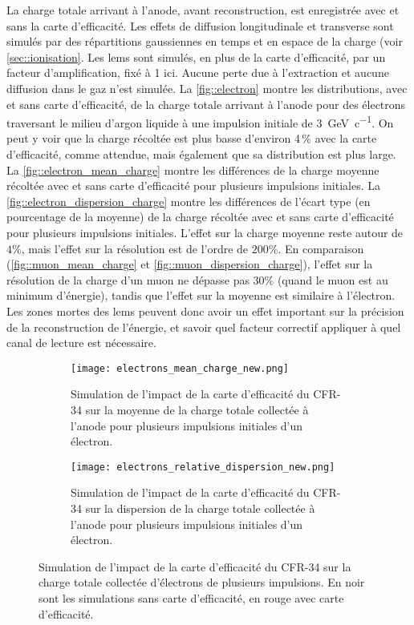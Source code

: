       La charge totale arrivant à l'anode, avant reconstruction, est enregistrée avec et sans la carte d'efficacité. Les effets de diffusion longitudinale et transverse sont simulés par des répartitions gaussiennes en temps et en espace de la charge (voir \autoref{sec::ionisation}. Les \glspl{lem} sont simulés, en plus de la carte d'efficacité, par un facteur d'amplification, fixé à 1 ici. Aucune perte due à l'extraction et aucune diffusion dans le gaz n'est simulée. La \autoref{fig::electron} montre les distributions, avec et sans carte d'efficacité, de la charge totale arrivant à l'anode pour des électrons traversant le milieu d'argon liquide à une impulsion initiale de \SI{3}{\giga\eV\per c}. On peut y voir que la charge récoltée est plus basse d'environ 4\,\% avec la carte d'efficacité, comme attendue, mais également que sa distribution est plus large. La \autoref{fig::electron_mean_charge} montre les différences de la charge moyenne récoltée avec et sans carte d'efficacité pour plusieurs impulsions initiales. La \autoref{fig::electron_dispersion_charge} montre les différences de l'écart type (en pourcentage de la moyenne) de la charge récoltée avec et sans carte d'efficacité pour plusieurs impulsions initiales. L'effet sur la charge moyenne reste autour de $4\%$, mais l'effet sur la résolution est de l'ordre de $200\%$. En comparaison (\autoref{fig::muon_mean_charge} et \autoref{fig::muon_dispersion_charge}), l'effet sur la résolution de la charge d'un muon ne dépasse pas $30\%$ (quand le muon est au minimum d'énergie), tandis que l'effet sur la moyenne est similaire à l'électron. Les zones mortes des \glspl{lem} peuvent donc avoir un effet important sur la précision de la reconstruction de l'énergie, et savoir quel facteur correctif appliquer à quel canal de lecture est nécessaire.
            
      \begin{figure}[htbp]
        \begin{subfigure}[t]{0.48\textwidth}
          \centering
          \texttt{[image: electrons\_mean\_charge\_new.png]}
          \caption{\label{fig::electron_mean_charge}Simulation de l'impact de la carte d'efficacité du CFR-34 sur la moyenne de la charge totale collectée à l'anode pour plusieurs impulsions initiales d'un électron.}
        \end{subfigure}
        \hfill
        \begin{subfigure}[t]{0.48\textwidth}
          \centering
          \texttt{[image: electrons\_relative\_dispersion\_new.png]}
          \caption{\label{fig::electron_dispersion_charge}Simulation de l'impact de la carte d'efficacité du CFR-34 sur la dispersion de la charge totale collectée à l'anode pour plusieurs impulsions initiales d'un électron.}
        \end{subfigure}
        \caption[Simulation de l'impact de la carte d'efficacité du CFR-34 sur la charge totale collectée d'électrons de plusieurs impulsions.]{Simulation de l'impact de la carte d'efficacité du CFR-34 sur la charge totale collectée d'électrons de plusieurs impulsions. En noir sont les simulations sans carte d'efficacité, en rouge avec carte d'efficacité.}
      \end{figure}
            
